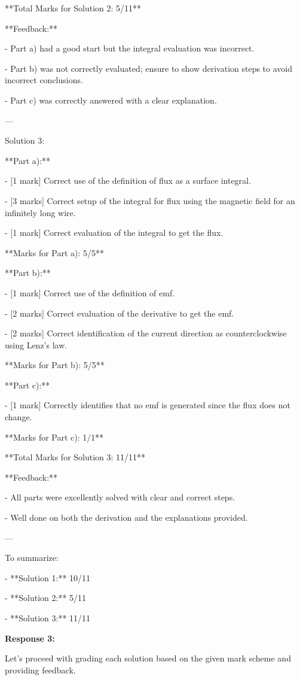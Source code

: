 \documentclass[a4paper,11pt]{article}
\begin{document}
**Total Marks for Solution 2: 5/11**

**Feedback:**

- Part a) had a good start but the integral evaluation was incorrect.

- Part b) was not correctly evaluated; ensure to show derivation steps to avoid incorrect conclusions.

- Part c) was correctly answered with a clear explanation.

---

Solution 3:

**Part a):**

- [1 mark] Correct use of the definition of flux as a surface integral.

- [3 marks] Correct setup of the integral for flux using the magnetic field for an infinitely long wire.

- [1 mark] Correct evaluation of the integral to get the flux.

**Marks for Part a): 5/5**

**Part b):**

- [1 mark] Correct use of the definition of emf.

- [2 marks] Correct evaluation of the derivative to get the emf.

- [2 marks] Correct identification of the current direction as counterclockwise using Lenz's law.

**Marks for Part b): 5/5**

**Part c):**

- [1 mark] Correctly identifies that no emf is generated since the flux does not change.

**Marks for Part c): 1/1**

**Total Marks for Solution 3: 11/11**

**Feedback:**

- All parts were excellently solved with clear and correct steps.

- Well done on both the derivation and the explanations provided.

---

To summarize:

- **Solution 1:** 10/11

- **Solution 2:** 5/11

- **Solution 3:** 11/11

\bigskip
\textbf{Response 3:}

Let's proceed with grading each solution based on the given mark scheme and providing feedback.
\end{document}
